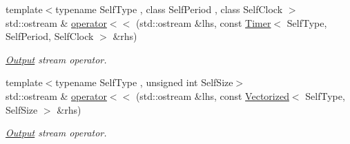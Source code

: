 \begin{DoxyCompactItemize}
{\footnotesize template$<$typename Self\-Type , class Self\-Period , class Self\-Clock $>$ }\\std\-::ostream \& \hyperlink{namespacemagrathea_a03a7bc77fcc95cd8f09daf739ade2e42}{operator$<$$<$} (std\-::ostream \&lhs, const \hyperlink{exceptionmagrathea_1_1Timer}{Timer}$<$ Self\-Type, Self\-Period, Self\-Clock $>$ \&rhs)
\begin{DoxyCompactList}\small\item\em \hyperlink{exceptionOutput}{Output} stream operator. \end{DoxyCompactList}\item 
{\footnotesize template$<$typename Self\-Type , unsigned int Self\-Size$>$ }\\std\-::ostream \& \hyperlink{namespacemagrathea_a83721b57d33887543111d35a80d1783f}{operator$<$$<$} (std\-::ostream \&lhs, const \hyperlink{exceptionmagrathea_1_1Vectorized}{Vectorized}$<$ Self\-Type, Self\-Size $>$ \&rhs)
\begin{DoxyCompactList}\small\item\em \hyperlink{exceptionOutput}{Output} stream operator. \end{DoxyCompactList}\end{DoxyCompactItemize}
